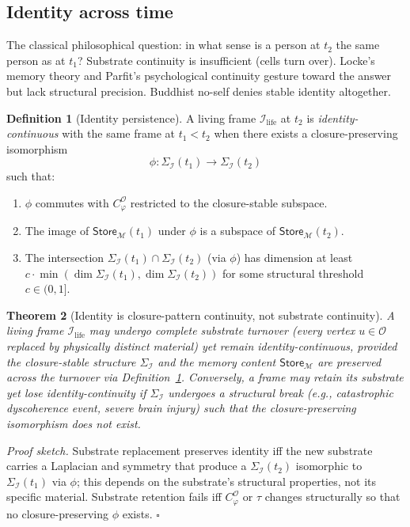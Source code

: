 \documentclass[11pt]{article}
\theoremstyle{plain}
\newtheorem{theorem}{Theorem}[section]
\theoremstyle{definition}
\newtheorem{definition}[theorem]{Definition}
\theoremstyle{remark}
\newcommand{\Ical}{\mathcal{I}}
\newcommand{\Ocal}{\mathcal{O}}
\newcommand{\Mcal}{\mathcal{M}}
\newcommand{\Cph}{C_\varphi}
\newcommand{\Ilife}{\Ical_{\mathrm{life}}}
\begin{document}
\subsection{Identity across time}\label{sec:identity}

The classical philosophical question: in what sense is a person at $t_2$ the same person as at $t_1$? Substrate continuity is insufficient (cells turn over). Locke's memory theory and Parfit's psychological continuity gesture toward the answer but lack structural precision. Buddhist no-self denies stable identity altogether.

\begin{definition}[Identity persistence]\label{def:identity}
A living frame $\Ilife$ at $t_2$ is \emph{identity-continuous} with the same frame at $t_1 < t_2$ when there exists a closure-preserving isomorphism
\[
  \phi : \Sigma_\Ical(t_1) \to \Sigma_\Ical(t_2)
\]
such that:
\begin{enumerate}[leftmargin=2em]
\item $\phi$ commutes with $\Cph^\Ocal$ restricted to the closure-stable subspace.
\item The image of $\mathsf{Store}_\Mcal(t_1)$ under $\phi$ is a subspace of $\mathsf{Store}_\Mcal(t_2)$.
\item The intersection $\Sigma_\Ical(t_1) \cap \Sigma_\Ical(t_2)$ (via $\phi$) has dimension at least $c \cdot \min(\dim \Sigma_\Ical(t_1), \dim \Sigma_\Ical(t_2))$ for some structural threshold $c \in (0, 1]$.
\end{enumerate}
\end{definition}

\begin{theorem}[Identity is closure-pattern continuity, not substrate continuity]\label{thm:identity}
A living frame $\Ilife$ may undergo complete substrate turnover (every vertex $u \in \Ocal$ replaced by physically distinct material) yet remain identity-continuous, provided the closure-stable structure $\Sigma_\Ical$ and the memory content $\mathsf{Store}_\Mcal$ are preserved across the turnover via Definition~\ref{def:identity}. Conversely, a frame may retain its substrate yet lose identity-continuity if $\Sigma_\Ical$ undergoes a structural break (e.g., catastrophic dyscoherence event, severe brain injury) such that the closure-preserving isomorphism does not exist.
\end{theorem}

\noindent\emph{Proof sketch.} Substrate replacement preserves identity iff the new substrate carries a Laplacian and symmetry that produce a $\Sigma_\Ical(t_2)$ isomorphic to $\Sigma_\Ical(t_1)$ via $\phi$; this depends on the substrate's structural properties, not its specific material. Substrate retention fails iff $\Cph^\Ocal$ or $\tau$ changes structurally so that no closure-preserving $\phi$ exists. \hfill$\square$
\end{document}
